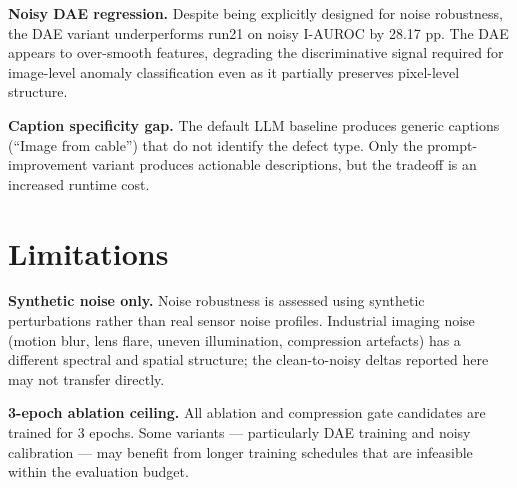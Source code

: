 \documentclass[11pt]{article}
\begin{document}
\textbf{Noisy DAE regression.} Despite being explicitly designed for noise
robustness, the DAE variant underperforms run21 on noisy I-AUROC by 28.17 pp.
The DAE appears to over-smooth features, degrading the discriminative signal
required for image-level anomaly classification even as it partially preserves
pixel-level structure.

\textbf{Caption specificity gap.} The default LLM baseline produces generic
captions (``Image from cable'') that do not identify the defect type. Only the
prompt-improvement variant produces actionable descriptions, but the tradeoff is an increased runtime cost. 

\section{Limitations}

\textbf{Synthetic noise only.} Noise robustness is assessed using synthetic
perturbations rather than real sensor noise profiles. Industrial imaging noise
(motion blur, lens flare, uneven illumination, compression artefacts) has a
different spectral and spatial structure; the clean-to-noisy deltas reported here
may not transfer directly.

\textbf{3-epoch ablation ceiling.} All ablation and compression gate candidates
are trained for 3 epochs. Some variants — particularly DAE training and noisy
calibration — may benefit from longer training schedules that are infeasible within
the evaluation budget. 
\end{document}
